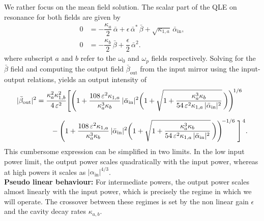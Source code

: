 We rather focus on the mean field solution. The scalar part of the QLE on resonance for both fields are given by 
 \begin{equation}
  \begin{split}
0 &= -\dfrac{\kappa_a}{2}\,\bar{\alpha} 
    + \epsilon\,\bar{\alpha}^{*}\,\bar{\beta} 
    + \sqrt{\kappa_{1,a}}\,\bar{\alpha}_{\mathrm{in}}, \\[6pt]
0 &= -\dfrac{\kappa_b}{2}\,\bar{\beta} 
    + \dfrac{\epsilon}{2}\,\bar{\alpha}^{2}.
  \end{split}
  \end{equation}
where subscript $a$ and $b$ refer to the $\omega_0$ and $\omega_p$ fields respectively. Solving for the $\bar{\beta}$ field and computing the output field $\bar{\beta}_{\mathrm{out}}$ from the input mirror using the input-output relations, yields an output intensity of 
\begin{align}
|\bar{\beta}_{\rm out}|^2
&= \frac{\kappa_{a}^{2}\kappa_{1,b}^{2}}{4\,\varepsilon^{2}}
\Bigg[
\Bigg(1+\frac{108\,\varepsilon^{2}\kappa_{1,a}}{\kappa_a^{3}\kappa_b}\,|\bar{\alpha}_{\rm in}|^{2}
\bigg(1+\sqrt{1+\frac{\kappa_a^{3}\kappa_b}{54\,\varepsilon^{2}\kappa_{1,a}\,|\bar{\alpha}_{\rm in}|^{2}}} \, \bigg)\Bigg)^{\!1/6} \nonumber \\[6pt]
&\qquad -
\Bigg(1+\frac{108\,\varepsilon^{2}\kappa_{1,a}}{\kappa_a^{3}\kappa_b}\,|\bar{\alpha}_{\rm in}|^{2}
\bigg(1+\sqrt{1+\frac{\kappa_a^{3}\kappa_b}{54\,\varepsilon^{2}\kappa_{1,a}\,|\bar{\alpha}_{\rm in}|^{2}}} \, \bigg)\Bigg)^{\!-1/6 \, }
\, \Bigg]^{\, 4}.
\end{align}
This cumbersome expression can be simplified in two limits. In the low input power limit, the output power scales quadratically with the input power, whereas at high powers it scales as $|\alpha_{\mathrm{in}}|^{4/3}$. \\

\noindent \textbf{Pseudo linear behaviour:} For intermediate powers, the output power scales almost linearly with the input power, which is precisely the regime in which we will operate. The crossover between these regimes is set by the non linear gain $\epsilon$ and the cavity decay rates $\kappa_{a,b}$. \\ 

